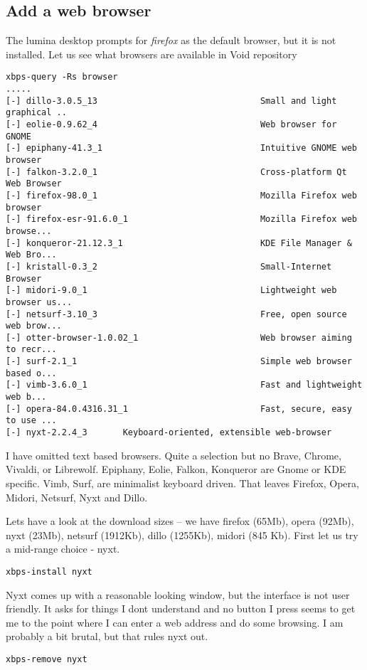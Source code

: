 \documentclass{article}  %
\begin{document}
{\subsection{Add a web browser}
The lumina desktop prompts for {\em firefox} as the default browser, but it is not installed.  Let us see what browsers are available in Void repository
\begin{verbatim}
xbps-query -Rs browser
.....
[-] dillo-3.0.5_13                                Small and light graphical ..
[-] eolie-0.9.62_4                                Web browser for GNOME
[-] epiphany-41.3_1                               Intuitive GNOME web browser
[-] falkon-3.2.0_1                                Cross-platform Qt Web Browser
[-] firefox-98.0_1                                Mozilla Firefox web browser
[-] firefox-esr-91.6.0_1                          Mozilla Firefox web browse...
[-] konqueror-21.12.3_1                           KDE File Manager & Web Bro...
[-] kristall-0.3_2                                Small-Internet Browser
[-] midori-9.0_1                                  Lightweight web browser us...
[-] netsurf-3.10_3                                Free, open source web brow...
[-] otter-browser-1.0.02_1                        Web browser aiming to recr...
[-] surf-2.1_1                                    Simple web browser based o...
[-] vimb-3.6.0_1                                  Fast and lightweight web b...
[-] opera-84.0.4316.31_1                          Fast, secure, easy to use ...
[-] nyxt-2.2.4_3       Keyboard-oriented, extensible web-browser
\end{verbatim}
I have omitted text based browsers. Quite a selection but no Brave, Chrome, Vivaldi, or Librewolf. Epiphany, Eolie, Falkon, Konqueror are Gnome or KDE specific. Vimb, Surf, are minimalist keyboard driven. That leaves Firefox, Opera, Midori, Netsurf, Nyxt and Dillo. 

Lets have a look at the download sizes -- we have firefox (65Mb), opera (92Mb), nyxt (23Mb), netsurf (1912Kb), dillo (1255Kb), midori (845 Kb). First let us try a mid-range choice - nyxt.
\begin{verbatim}
xbps-install nyxt
\end{verbatim}
Nyxt comes up with a reasonable looking window, but the interface is not user friendly. It asks for things I dont understand and no button I press seems to get me to the point where I can enter a web address and do some browsing. I am probably a bit brutal, but that rules nyxt out. 
\begin{verbatim}
xbps-remove nyxt
\end{verbatim}

}
\end{document}
